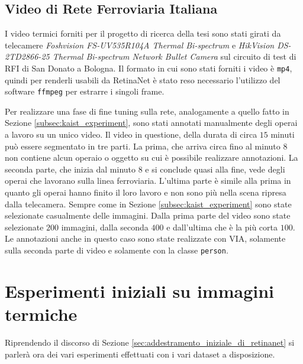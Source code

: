 \subsection{Video di Rete Ferroviaria Italiana}
\label{subsec:rfi_video_experiment}
I video termici forniti per il progetto di ricerca della tesi sono stati girati da telecamere \textit{Foshvision FS-UV535R104A Thermal Bi-spectrum} e \textit{HikVision DS-2TD2866-25 Thermal Bi-spectrum Network Bullet Camera} sul circuito di test di \ac{RFI} di San Donato a Bologna.
Il formato in cui sono stati forniti i video è \texttt{mp4}, quindi per renderli usabili da RetinaNet è stato reso necessario l'utilizzo del software \texttt{ffmpeg} per estrarre i singoli frame. 

Per realizzare una fase di fine tuning sulla rete, analogamente a quello fatto in Sezione \ref{subsec:kaist_experiment}, sono stati annotati manualmente degli operai a lavoro su un unico video.
Il video in questione, della durata di circa $15$ minuti può essere segmentato in tre parti. La prima, che arriva circa fino al minuto $8$ non contiene alcun operaio o oggetto su cui è possibile realizzare annotazioni. La seconda parte, che inizia dal minuto 8 e si conclude quasi alla fine, vede degli operai che lavorano sulla linea ferroviaria. L'ultima parte è simile alla prima in quanto gli operai hanno finito il loro lavoro e non sono più nella scena ripresa dalla telecamera. 
Sempre come in Sezione \ref{subsec:kaist_experiment} sono state selezionate casualmente delle immagini. Dalla prima parte del video sono state selezionate $200$ immagini, dalla seconda $400$ e dall'ultima che è la più corta $100$. Le annotazioni anche in questo caso sono state realizzate con \ac{VIA}, solamente sulla seconda parte di video e solamente con la classe \texttt{person}.
 

\section{Esperimenti iniziali su immagini termiche}
\label{sec:init_experiment_thermal}
Riprendendo il discorso di Sezione \ref{sec:addestramento_iniziale_di_retinanet} si parlerà ora dei vari esperimenti effettuati con i vari dataset a disposizione. 




